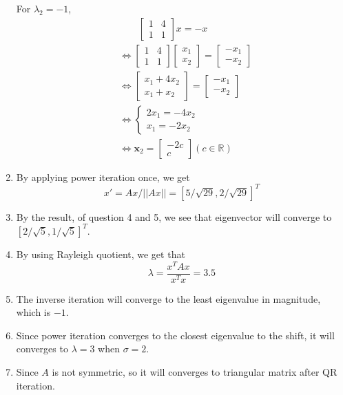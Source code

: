 \documentclass[11pt]{article}
\begin{document}
\begin{enumerate}
		 For $\lambda_2 = -1$,
		 \begin{align}
		 	&\phantom{\Leftrightarrow\ \ }\begin{bmatrix}
		 		1 & 4\\
		 		1 & 1
		 	\end{bmatrix}
		 	x = -x\nonumber\\
		 	&\Leftrightarrow\begin{bmatrix}
		 		1 & 4\\
		 		1 & 1
		 	\end{bmatrix}
		 	\begin{bmatrix}
		 		x_1\\
		 		x_2
		 	\end{bmatrix} = \begin{bmatrix}
		 		-x_1\\
		 		-x_2
		 	\end{bmatrix}\nonumber\\
		 	&\Leftrightarrow
		 	\begin{bmatrix}
		 		x_1 + 4x_2\\
		 		x_1 + x_2
		 	\end{bmatrix} = 
		 	\begin{bmatrix}
		 		-x_1\\
		 		-x_2
		 	\end{bmatrix}\nonumber\\
		 	&\Leftrightarrow
		 	\begin{cases}
		 		2x_1 = -4x_2\\
		 		x_1 = -2x_2
		 	\end{cases}\nonumber\\
		 	&\Leftrightarrow
		 	\mathbf{x}_2 = \begin{bmatrix}
		 		-2c\\
		 		c
		 	\end{bmatrix}(c \in \mathbb{R})
		 \end{align}
		 \item By applying power iteration once, we get
		 	\[x' = Ax / ||Ax|| = [5/\sqrt{29}, 2/\sqrt{29}]^T\]
		 \item By the result, of question 4 and 5, we see that eigenvector will converge to $[2/\sqrt{5}, 1/\sqrt{5}]^T$.
		 \item By using Rayleigh quotient, we get that 
		 \[\lambda = \frac{x^TAx}{x^Tx} = 3.5\]
		 
		 \item The inverse iteration will converge to the least eigenvalue in magnitude, which is $-1$.
		 \item Since power iteration converges to the closest eigenvalue to the shift, it will converges to $\lambda = 3$ when $\sigma = 2$.
		 \item Since $A$ is not symmetric, so it will converges to triangular matrix after QR iteration.
	\end{enumerate}
\end{document}
